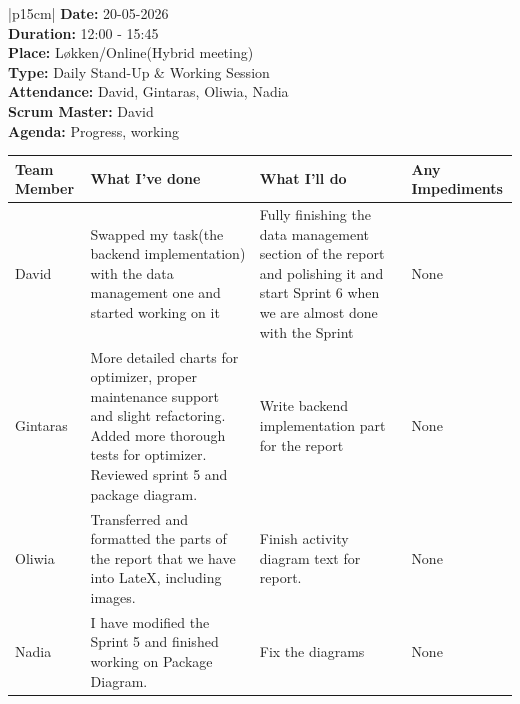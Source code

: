\begin{table}[H]
    \centering
    \begin{tabular}{|p{15cm}|}   
        \hline
        \textbf{Date:}  20-05-2026 \\
        \textbf{Duration:}  12:00 - 15:45 \\
        \textbf{Place:}  Løkken/Online(Hybrid meeting) \\
        \textbf{Type:} Daily Stand-Up \& Working Session \\
        \textbf{Attendance:} David, Gintaras, Oliwia, Nadia \\
        \textbf{Scrum Master:}  David \\
        \textbf{Agenda:} Progress, working
        \begin{table}[H]
            \begin{tabular}{|p{1.75cm}|p{4cm}|p{4cm}|p{4cm}|}
                \hline
                \cellcolor[HTML]{BFBFBF}  \textbf{Team Member} & \cellcolor[HTML]{BFBFBF}  \textbf{What I've done} & \cellcolor[HTML]{BFBFBF}  \textbf{What I'll do} & \cellcolor[HTML]{BFBFBF}  \textbf{Any Impediments}\\
                \hline
                \cellcolor[HTML]{d4d4d4} David & Swapped my task(the backend implementation) with the data management one and started working on it & Fully finishing the data management section of the report and polishing it and start Sprint 6 when we are almost done with the Sprint & None  \\
                \hline
                \cellcolor[HTML]{d4d4d4} Gintaras & More detailed charts for optimizer, proper maintenance support and slight refactoring. Added more thorough tests for optimizer. Reviewed sprint 5 and package diagram. & Write backend implementation part for the report & None  \\
                \hline
                \cellcolor[HTML]{d4d4d4} Oliwia & Transferred and formatted the parts of the report that we have into LateX, including images. & Finish activity diagram text for report. & None  \\
                \hline
                \cellcolor[HTML]{d4d4d4} Nadia & I have modified the Sprint 5 and finished working on Package Diagram. & Fix the diagrams & None  \\
                \hline
            \end{tabular}
        \end{table} \\
        \hline
    \end{tabular}
\end{table}

